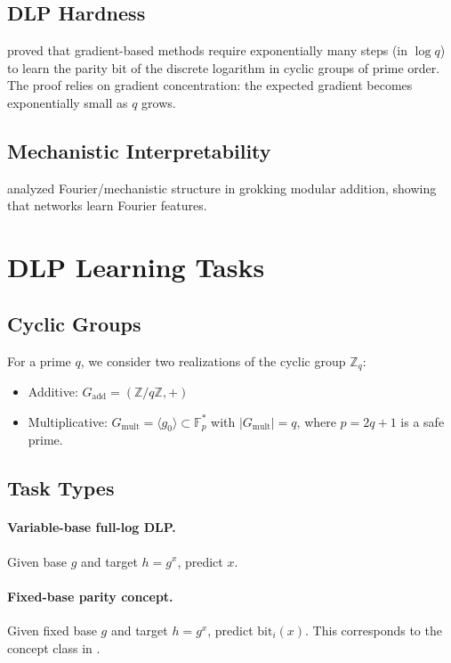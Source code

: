 \documentclass[11pt]{article}
\begin{document}
\subsection{DLP Hardness}

\citet{takhanov2024intractability} proved that gradient-based methods require exponentially many steps (in $\log q$) to learn the parity bit of the discrete logarithm in cyclic groups of prime order. The proof relies on gradient concentration: the expected gradient becomes exponentially small as $q$ grows.

\subsection{Mechanistic Interpretability}

\citet{nanda2023progress} analyzed Fourier/mechanistic structure in grokking modular addition, showing that networks learn Fourier features.

\section{DLP Learning Tasks}\label{sec:tasks}

\subsection{Cyclic Groups}

For a prime $q$, we consider two realizations of the cyclic group $\mathbb{Z}_q$:
\begin{itemize}[leftmargin=*]
    \item Additive: $G_{\text{add}} = (\mathbb{Z}/q\mathbb{Z}, +)$
    \item Multiplicative: $G_{\text{mult}} = \langle g_0 \rangle \subset \mathbb{F}_p^*$ with $|G_{\text{mult}}| = q$, where $p = 2q+1$ is a safe prime.
\end{itemize}

\subsection{Task Types}

\paragraph{Variable-base full-log DLP.} Given base $g$ and target $h = g^x$, predict $x$.

\paragraph{Fixed-base parity concept.} Given fixed base $g$ and target $h = g^x$, predict $\text{bit}_i(x)$. This corresponds to the concept class in \citet{takhanov2024intractability}.
\end{document}
